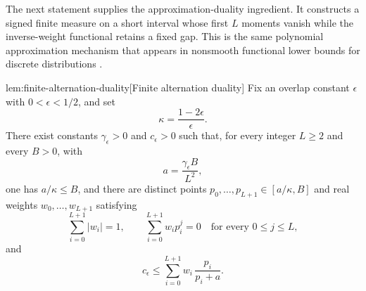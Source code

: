 \documentclass[11pt]{article}
\begin{document}
The next statement supplies the approximation-duality ingredient. It constructs a signed finite measure on a short interval whose first \(L\) moments vanish while the inverse-weight functional retains a fixed gap. This is the same polynomial approximation mechanism that appears in nonsmooth functional lower bounds for discrete distributions \citep{JiaoVenkatHanWeissman2015,WuYang2016,ValiantValiant2017,OrlitskySureshWu2016}.

\begin{lemmav}{lem:finite-alternation-duality}[Finite alternation duality]
Fix an overlap constant \(\epsilon\) with \(0<\epsilon<1/2\), and set
\[
\kappa=\frac{1-2\epsilon}{\epsilon}.
\]
There exist constants \(\gamma_\epsilon>0\) and \(c_\epsilon>0\) such that, for every integer \(L\ge 2\) and every \(B>0\), with
\[
a=\frac{\gamma_\epsilon B}{L^2},
\]
one has \(a/\kappa\le B\), and there are distinct points \(p_0,\ldots,p_{L+1}\in [a/\kappa,B]\) and real weights \(w_0,\ldots,w_{L+1}\) satisfying
\[
\sum_{i=0}^{L+1}|w_i|=1,\qquad
\sum_{i=0}^{L+1}w_i p_i^j=0\quad\text{for every }0\le j\le L,
\]
and
\[
c_\epsilon\le \sum_{i=0}^{L+1}w_i\,\frac{p_i}{p_i+a}.
\]
\end{lemmav}
\end{document}
